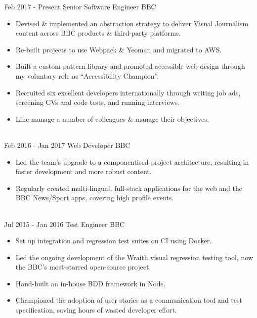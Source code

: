 \documentclass[letterpaper]{twentysecondcv} %
\begin{document}
\begin{twenty} %
    \twentyitem
    	{Feb 2017 -}
		{Present}
        {Senior Software Engineer}
        {BBC}
        {}
        {
        \begin{itemize}
        \item Devised \& implemented an abstraction strategy to deliver Visual Journalism content across BBC products \& third-party platforms.
        \item Re-built projects to use Webpack \& Yeoman and migrated to AWS.
        \item Built a custom pattern library and promoted accessible web design through my voluntary role as ``Accessibility Champion''.
        \item Recruited six excellent developers internationally through writing job ads, screening CVs and code tests, and running interviews.
        \item Line-manage a number of colleagues \& manage their objectives.
    \end{itemize}
    	}
    \\
	\twentyitem
    	{Feb 2016 -}
		{Jan 2017}
        {Web Developer}
        {BBC}
        {}
        {
        {\begin{itemize}
        \item Led the team's upgrade to a componentised project architecture, resulting in faster development and more robust content.
        \item Regularly created multi-lingual, full-stack applications for the web and the BBC News/Sport apps, covering high profile events.
    \end{itemize}}
        }
    \\
    \twentyitem
  		{Jul 2015 -}
		{Jan 2016}
        {Test Engineer}
        {BBC}
        {}
        {
        {\begin{itemize}
        \item Set up integration and regression test suites on CI using Docker.
        \item Led the ongoing development of the Wraith visual regression testing tool, now the BBC's most-starred open-source project.
        \item Hand-built an in-house BDD framework in Node.
        \item Championed the adoption of user stories as a communication tool and test specification, saving hours of wasted developer effort.
    \end{itemize}}
}
\end{twenty}
\end{document}
